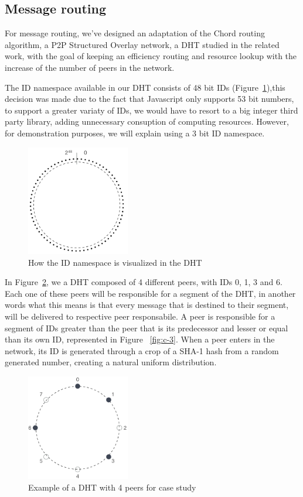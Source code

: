 \subsection{Message routing}

For message routing, we've designed an adaptation of the Chord routing algorithm, a P2P Structured Overlay network, a DHT studied in the related work, with the goal of keeping an efficiency routing and resource lookup with the increase of the number of peers in the network.

The ID namespace available in our DHT consists of 48 bit IDs (Figure~\ref{fig:c-1}),this decision was made due to the fact that Javascript only supports 53 bit numbers, to support a greater variaty of IDs, we would have to resort to a big integer third party library, adding unnecessary consuption of computing resources. However, for demonstration purposes, we will explain using a 3 bit ID namespace.

\begin{figure}[h!]
  \centering
  \includegraphics[width=0.4\textwidth]{figs/chord-1}
  \caption{How the ID namespace is visualized in the DHT}
  \label{fig:c-1}
\end{figure}

In Figure~\ref{fig:c-2}, we a DHT composed of 4 different peers, with IDs 0, 1, 3 and 6. Each one of these peers will be responsible for a segment of the DHT, in another words what this means is that every message that is destined to their segment, will be delivered to respective peer responsabile. A peer is responsible for a segment of IDs greater than the peer that is its predecessor and lesser or equal than its own ID, represented in Figure ~\ref{fig:c-3}. When a peer enters in the network, its ID is generated through a crop of a SHA-1 hash from a random generated number, creating a natural uniform distribution.

\begin{figure}[h!]
  \centering
  \includegraphics[width=0.4\textwidth]{figs/chord-2}
  \caption{Example of a DHT with 4 peers for case study}
  \label{fig:c-2}
\end{figure}

